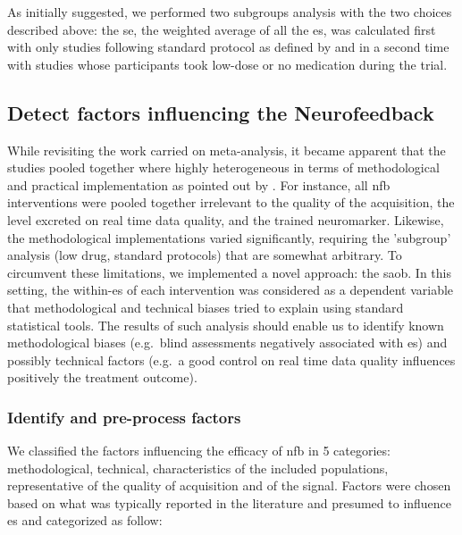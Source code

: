 As initially suggested, we performed two subgroups analysis with the two choices described above: the \gls{se}, the weighted average of all the
\gls{es}, was calculated first with only studies following standard protocol as defined by \citet{Arns2014} and in a second time with studies 
whose participants took low-dose or no medication during the trial.  

\subsection{Detect factors influencing the Neurofeedback}

While revisiting the work carried on meta-analysis, it became apparent that the studies pooled together where highly heterogeneous 
in terms of methodological and practical implementation as pointed out by \citet{Alkoby2017}. For instance, all \gls{nfb} interventions were pooled together irrelevant to the 
quality of the acquisition, the level excreted on real time data quality, and the trained neuromarker. 
Likewise, the methodological implementations varied significantly, requiring the 'subgroup' analysis (low drug, standard protocols) 
that are somewhat arbitrary. To circumvent these limitations, we implemented a novel approach: the \gls{saob}. 
In this setting, the within-\gls{es} of each intervention was considered as a dependent variable that
methodological and technical biases tried to explain using standard statistical tools. The results of such analysis should enable us to identify 
known methodological biases (e.g.\ blind assessments negatively associated with \gls{es}) and possibly technical factors (e.g.\ a good control on 
real time data quality influences positively the treatment outcome). 

\subsubsection{Identify and pre-process factors}

We classified the factors influencing the efficacy of \gls{nfb} in 5 categories: methodological, technical, characteristics of the included
populations, representative of the quality of acquisition and of the signal. 
Factors were chosen based on what was typically reported in the literature and presumed to influence \gls{es} and categorized as follow:

